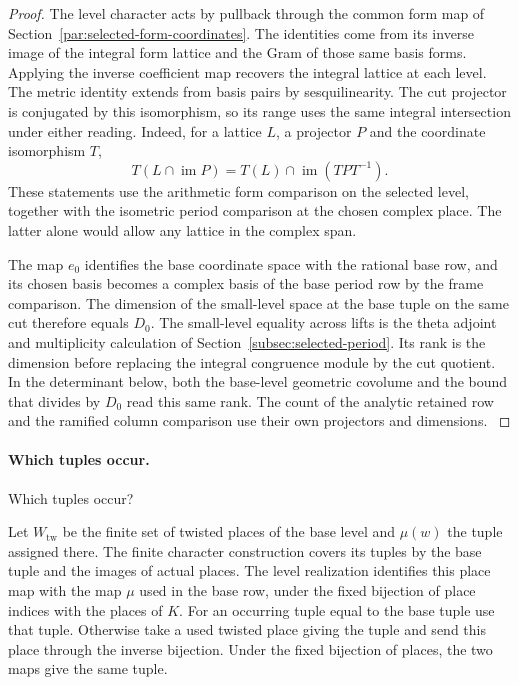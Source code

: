 \begin{proof}
The level character acts by pullback
through the common form map of
Section~\ref{par:selected-form-coordinates}. The identities
come from its inverse image of the integral form lattice
and the Gram of those same basis forms. Applying the
inverse coefficient map recovers the integral lattice
at each level. The metric identity extends from basis
pairs by sesquilinearity. The cut projector is conjugated
by this isomorphism, so its range uses the same integral
intersection under either reading.
Indeed, for a lattice \(L\), a projector \(P\) and the coordinate isomorphism \(T\),
\[
  T(L\cap\operatorname{im}P)=T(L)\cap\operatorname{im}(TPT^{-1}).
\]
 These statements use
the arithmetic form comparison on the selected level,
together with the isometric period comparison at the
chosen complex place. The latter alone would allow any
lattice in the complex span.

The map \(e_0\) identifies the
base coordinate space with the rational base row, and
its chosen basis becomes a complex basis of the base
period row by the frame comparison. The dimension of
the small-level space at the base tuple on the same cut
therefore equals \(D_0\). The small-level equality across
lifts is the theta adjoint and multiplicity calculation
of Section~\ref{subsec:selected-period}. Its rank is the
dimension before replacing the integral congruence module
by the cut quotient. In the determinant below, both
the base-level geometric covolume and the bound that
divides by \(D_0\) read this same rank. The count of the
analytic retained row and the ramified column comparison
use their own projectors and dimensions.
\label{cor:division-level-pins-1}

\end{proof}

\paragraph{Which tuples occur.}

Which tuples occur?

Let \(W_{\mathrm{tw}}\) be the finite set of twisted places
of the base level and \(\mu(w)\) the tuple assigned there.
The finite character construction covers its tuples by
the base tuple and the images of actual places. The
level realization identifies this place map with the
map \(\mu\) used in the base row, under the fixed
bijection of place indices with the places of \(K\).
For an occurring tuple equal to the base tuple use that tuple. Otherwise take a used twisted
place giving the tuple and send this place through the inverse bijection. Under the fixed bijection of places, the two maps give the same tuple.

